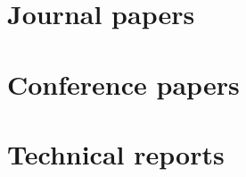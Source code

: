 \documentclass{article}
\begin{document}
	\section{Journal papers}
	\nocite{phan2014multimedia}		      \printbibliography[heading=none]
		
	\section{Conference papers}
	\nocite{phan2012codeword}
	\printbibliography[heading=none]

	\section{Technical reports}
	\nocite{lam2012nii}
	\nocite{lam2013nii}		
	\printbibliography[heading=none]	

	
\end{document}
